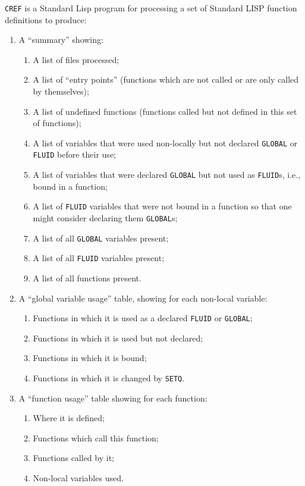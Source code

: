 {\tt CREF} is a Standard Lisp program for processing a
set of Standard LISP function definitions to produce:
\begin{enumerate}
\item A ``summary'' showing:
\begin{enumerate}
\item A list of files processed;
\item A list of ``entry points'' (functions which are not called or
are only called by themselves);
\item A list of undefined functions (functions called but not
defined in this set of functions);
\item A list of variables that were used non-locally but not
declared {\tt GLOBAL} or {\tt FLUID} before their use;
\item A list of variables that were declared {\tt GLOBAL} but not used
as {\tt FLUID}s, i.e., bound in a function;
\item A list of {\tt FLUID} variables that were not bound in a function
so that one might consider declaring them {\tt GLOBAL}s;
\item A list of all {\tt GLOBAL} variables present;
\item A list of all {\tt FLUID} variables present;
\item A list of all functions present.
\end{enumerate}
\item A ``global variable usage'' table, showing for each non-local
   variable:
\begin{enumerate}
\item Functions in which it is used as a declared {\tt FLUID} or {\tt GLOBAL};
\item Functions in which it is used but not declared;
\item Functions in which it is bound;
\item Functions in which it is changed by {\tt SETQ}.
\end{enumerate}
\item A ``function usage'' table showing for each function:
\begin{enumerate}
\item Where it is defined;
\item Functions which call this function;
\item Functions called by it;
\item Non-local variables used.
\end{enumerate}
\end{enumerate}

